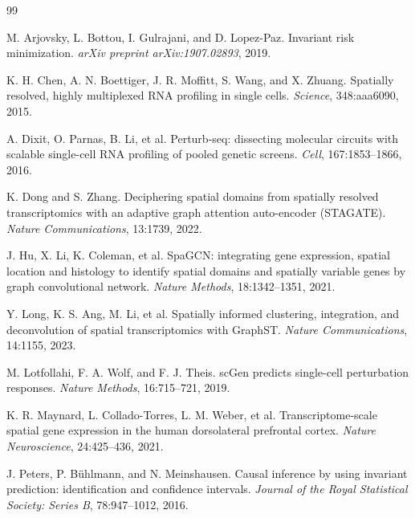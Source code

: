 \documentclass[11pt]{article}
\begin{document}

\begin{thebibliography}{99}

M. Arjovsky, L. Bottou, I. Gulrajani, and D. Lopez-Paz.
\newblock Invariant risk minimization.
\newblock \emph{arXiv preprint arXiv:1907.02893}, 2019.

K. H. Chen, A. N. Boettiger, J. R. Moffitt, S. Wang, and X. Zhuang.
\newblock Spatially resolved, highly multiplexed RNA profiling in single cells.
\newblock \emph{Science}, 348:aaa6090, 2015.

A. Dixit, O. Parnas, B. Li, et al.
\newblock Perturb-seq: dissecting molecular circuits with scalable single-cell
RNA profiling of pooled genetic screens.
\newblock \emph{Cell}, 167:1853--1866, 2016.

K. Dong and S. Zhang.
\newblock Deciphering spatial domains from spatially resolved transcriptomics
with an adaptive graph attention auto-encoder (STAGATE).
\newblock \emph{Nature Communications}, 13:1739, 2022.

J. Hu, X. Li, K. Coleman, et al.
\newblock SpaGCN: integrating gene expression, spatial location and histology to
identify spatial domains and spatially variable genes by graph convolutional
network.
\newblock \emph{Nature Methods}, 18:1342--1351, 2021.

Y. Long, K. S. Ang, M. Li, et al.
\newblock Spatially informed clustering, integration, and deconvolution of
spatial transcriptomics with GraphST.
\newblock \emph{Nature Communications}, 14:1155, 2023.

M. Lotfollahi, F. A. Wolf, and F. J. Theis.
\newblock scGen predicts single-cell perturbation responses.
\newblock \emph{Nature Methods}, 16:715--721, 2019.

K. R. Maynard, L. Collado-Torres, L. M. Weber, et al.
\newblock Transcriptome-scale spatial gene expression in the human dorsolateral
prefrontal cortex.
\newblock \emph{Nature Neuroscience}, 24:425--436, 2021.

J. Peters, P. B\"uhlmann, and N. Meinshausen.
\newblock Causal inference by using invariant prediction: identification and
confidence intervals.
\newblock \emph{Journal of the Royal Statistical Society: Series B},
78:947--1012, 2016.


\end{thebibliography}
\end{document}
